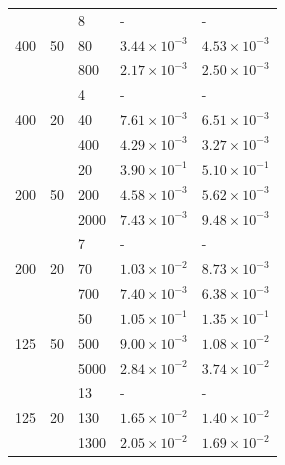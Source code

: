 \begin{table}
\begin{tabular}{lllll}
    \hline
    \multirow{3}{*}{ 400}  & \multirow{3}{*}{ 50} & 8    & - & -                                         \\
                           &                      & 80   & $3.44 \times 10^{-3}$ & $4.53 \times 10^{-3}$ \\
                           &                      & 800  & $2.17 \times 10^{-3}$ & $2.50 \times 10^{-3}$ \\
    \hline
    \multirow{3}{*}{ 400}  & \multirow{3}{*}{ 20} & 4    & - & -                                         \\
                           &                      & 40   & $7.61 \times 10^{-3}$ & $6.51 \times 10^{-3}$ \\
                           &                      & 400  & $4.29 \times 10^{-3}$ & $3.27 \times 10^{-3}$ \\
    \hline
    \multirow{3}{*}{ 200}  & \multirow{3}{*}{ 50} & 20   & $3.90 \times 10^{-1}$ & $5.10 \times 10^{-1}$ \\
                           &                      & 200  & $4.58 \times 10^{-3}$ & $5.62 \times 10^{-3}$ \\
                           &                      & 2000 & $7.43 \times 10^{-3}$ & $9.48 \times 10^{-3}$ \\
    \hline
    \multirow{3}{*}{ 200}  & \multirow{3}{*}{ 20} & 7    & - & -                                         \\
                           &                      & 70   & $1.03 \times 10^{-2}$ & $8.73 \times 10^{-3}$ \\
                           &                      & 700  & $7.40 \times 10^{-3}$ & $6.38 \times 10^{-3}$ \\
    \hline
    \multirow{3}{*}{ 125}  & \multirow{3}{*}{ 50} & 50   & $1.05 \times 10^{-1}$ & $1.35 \times 10^{-1}$ \\
                           &                      & 500  & $9.00 \times 10^{-3}$ & $1.08 \times 10^{-2}$ \\
                           &                      & 5000 & $2.84 \times 10^{-2}$ & $3.74 \times 10^{-2}$ \\
    \hline
    \multirow{3}{*}{ 125}  & \multirow{3}{*}{ 20} & 13   & - & -                                         \\
                           &                      & 130  & $1.65 \times 10^{-2}$ & $1.40 \times 10^{-2}$ \\
                           &                      & 1300 & $2.05 \times 10^{-2}$ & $1.69 \times 10^{-2}$ \\

\end{tabular}
\end{table}
